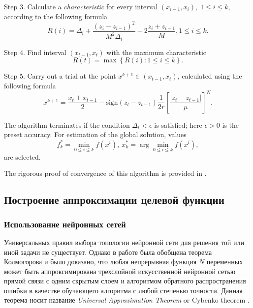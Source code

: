 \documentclass[sensors,article,submit,moreauthors,pdftex]{Definitions/mdpi}
\begin{document}
Step 3. Calculate a \textit{characteristic} for every interval $(x_{i-1}, x_i), \; 1\leq i \leq k,$   according to the following formula
\begin{equation}\label{R}
R(i)=\Delta_i+\frac{(z_i-z_{i-1})^2}{M^2\Delta_i}-2\frac{z_i+z_{i-1}}{M},1 \leq i \leq k.
\end{equation}

Step 4. Find interval $(x_{t-1},x_t)$ with the maximum characteristic
\begin{equation}\label{MaxR}
R(t)=\max{\left\{R(i): 1 \leq i \leq k \right\}}.
\end{equation}

Step 5. Carry out a trial at the point $x^{k+1}\in(x_{t-1},x_t)$, calculated using the following formula
\begin{equation}\label{NewX}
x^{k+1} = \frac{x_t+x_{t-1}}{2} - \mathrm{sign}(z_t-z_{t-1})\frac{1}{2r}\left[\frac{\left|z_t-z_{t-1}\right|}{\mu}\right]^N.
\end{equation}

The algorithm terminates if the condition $\Delta_t<\epsilon$ is satisfied; here $\epsilon>0$ is the preset accuracy. For estimation of the global solution, values
\[
f_k^\ast=\min_{0\leq i \leq k}f(x^i), \ x_k^\ast=\arg \min_{0\leq i \leq k}f(x^i),
\]
are selected.

The rigorous proof of convergence of this algorithm is provided in \cite{Strongin2000}. 

\subsection{Построение аппроксимации целевой функции}

\subsubsection{Использование нейронных сетей}

Универсальных правил выбора топологии нейронной сети для решения той или иной задачи не существует. Однако в работе \cite{Cybenko1989} была обобщена теорема Колмогорова и было доказано, что любая непрерывная функция $N$ переменных может быть аппроксимирована трехслойной искусственной нейронной сетью прямой связи с одним скрытым слоем и алгоритмом обратного распространения ошибки в качестве обучающего алгоритма с любой степенью точности. Данная теорема носит название \textit{Universal Approximation Theorem} or Cybenko theorem \cite{Hassoun1995}.
\end{document}
